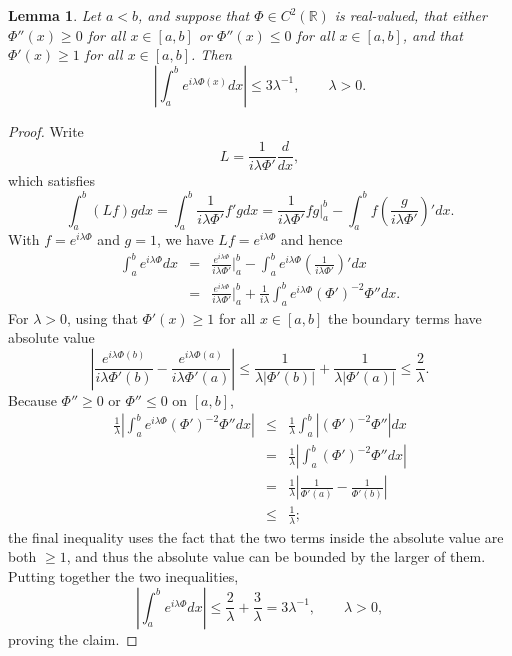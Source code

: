 \documentclass{article}
\newtheorem{lemma}[theorem]{Lemma}
\theoremstyle{definition}
\begin{document}
\begin{lemma}
Let $a<b$,
 and suppose that $\Phi \in C^2(\mathbb{R})$ is real-valued, that either $\Phi''(x) \geq 0$ for all $x \in [a,b]$ or $\Phi''(x) \leq 0$ for all $x \in [a,b]$,
 and   that $\Phi'(x) \geq 1$ for  all $x \in [a,b]$. 
 Then 
 \[
\left| \int_a^b e^{i\lambda \Phi(x)} dx \right| \leq 3 \lambda^{-1}, \qquad \lambda >0.
 \]
 \label{22}
\end{lemma}
\begin{proof}
Write
\[
L = \frac{1}{i \lambda \Phi'} \frac{d}{dx},
\]
which satisfies
\[
\int_a^b (Lf)g dx = \int_a^b  \frac{1}{i \lambda \Phi'} f' g dx =  \frac{1}{i \lambda \Phi'} f g \bigg|_a^b 
-\int_a^b f \left( \frac{g}{i \lambda \Phi'} \right)' dx.
\]
With $f=e^{i\lambda \Phi}$ and $g=1$, we have $Lf = e^{i\lambda \Phi}$ and hence
\begin{eqnarray*}
\int_a^b e^{i\lambda \Phi} dx &=& \frac{e^{i\lambda \Phi}}{i \lambda \Phi'} \bigg|_a^b - \int_a^b e^{i\lambda \Phi} \left( \frac{1}{i \lambda \Phi'} \right)' dx\\
&=& \frac{e^{i\lambda \Phi}}{i \lambda \Phi'} \bigg|_a^b  + \frac{1}{i\lambda} \int_a^b e^{i\lambda \Phi} (\Phi')^{-2} \Phi'' dx.
\end{eqnarray*}
For $\lambda>0$, using that $\Phi'(x) \geq 1$ for all $x \in [a,b]$ 
 the boundary terms have absolute value
 \[
\left|  \frac{e^{i\lambda \Phi(b)}}{i \lambda \Phi'(b)} -  \frac{e^{i\lambda \Phi(a)}}{i \lambda \Phi'(a)} \right|
\leq \frac{1}{\lambda |\Phi'(b)|} + \frac{1}{\lambda |\Phi'(a)|}
\leq \frac{2}{\lambda}.
\]
Because $\Phi'' \geq 0$ or $\Phi'' \leq 0$ on $[a,b]$,
\begin{eqnarray*}
\frac{1}{\lambda} \left| \int_a^b e^{i\lambda \Phi} (\Phi')^{-2} \Phi'' dx \right| 
&\leq& \frac{1}{\lambda} \int_a^b |  (\Phi')^{-2} \Phi''| dx\\
&=&\frac{1}{\lambda} \left| \int_a^b (\Phi')^{-2} \Phi'' dx \right| \\
&=&\frac{1}{\lambda} \left| \frac{1}{\Phi'(a)}- \frac{1}{\Phi'(b)} \right|\\
&\leq&\frac{1}{\lambda};
\end{eqnarray*}
the final inequality uses the fact that the two terms inside the absolute value are both $\geq 1$, and thus the absolute value can be bounded by the larger
of them.
Putting together the two inequalities,
\[
\left|\int_a^b e^{i\lambda \Phi} dx\right| \leq \frac{2}{\lambda}+\frac{3}{\lambda}= 3 \lambda^{-1}, \qquad \lambda>0,
\]
proving the claim.
\end{proof}
\end{document}
